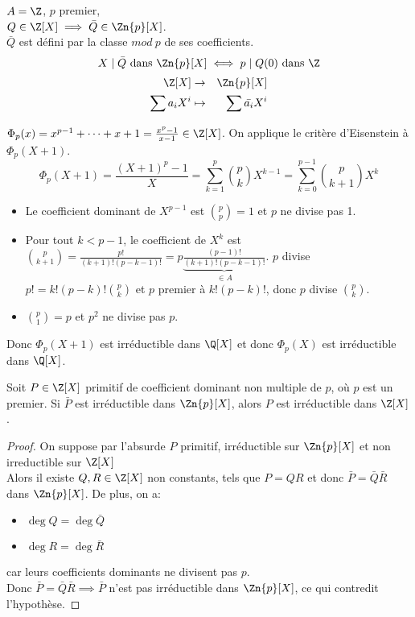\begin{example}
	$A = \Z$, $p$ premier,\\
	$Q \in \Z[X] \implies \bar{Q} \in \Zn{p}[X]$.\\
	$\bar{Q}$ est défini par la classe $mod\  p$ de ses coefficients.
	$$X \mid \bar{Q} \text{ dans } \Zn{p}[X] \iff p \mid Q(0) \text{ dans } \Z$$
	\begin{eqnarray*}
		\Z[X] &\to& \Zn{p}[X] \\
		\sum a_iX^i &\mapsto& \sum \bar{a_i}X^i
	\end{eqnarray*}
\end{example}


\begin{example}
	$\Phi_p(x) = x^{p-1} + \cdots + x + 1  = \frac{x^p - 1}{x-1} \in \Z[X]$.
	On applique le critère d'Eisenstein à $\Phi_p(X+1)$.
	$$ \Phi_p(X+1) = \frac{(X+1)^p - 1}{X} = \sum_{k=1}^p \binom{p}{k} X^{k-1} = \sum_{k=0}^{p-1} \binom{p}{k+1} X^k$$
	\begin{itemize}
		\item Le coefficient dominant de $X^{p-1}$ est $\binom{p}{p} = 1$ et $p$ ne divise pas 1.
		\item Pour tout $k < p-1$, le coefficient de $X^k$ est $\binom{p}{k+1} = \frac{p!}{(k+1)!(p-k-1)!} = p \underbrace{\frac{(p-1)!}{(k+1)!(p-k-1)!}}_{\in A}$.
		      $p$ divise $p! = k!(p-k)!\binom{p}{k}$ et $p$ premier à $k!(p-k)!$, donc $p$ divise $\binom{p}{k}$.
		\item $\binom{p}{1} = p$ et $p^2$ ne divise pas $p$.
	\end{itemize}
	Donc $\Phi_p(X+1)$ est irréductible dans $\Q[X]$ et donc $\Phi_p(X)$ est irréductible dans $\Q[X]$.
\end{example}


\begin{prop}
	Soit $P \in \Z[X]$ primitif de coefficient dominant non multiple de $p$, où $p$ est un premier.
	Si $\bar{P}$ est irréductible dans  $\Zn{p}[X]$, alors $P$ est irréductible dans $\Z[X]$.
\end{prop}

\begin{proof}
	On suppose par l'absurde $P$ primitif, irréductible sur $\Zn{p}[X]$ et non irreductible sur $\Z[X]$\\
	Alors il existe $Q, R \in \Z[X]$ non constants, tels que $P = QR$
	et donc $\bar{P} = \bar{Q}\bar{R}$ dans $\Zn{p}[X]$.
	De plus, on a:
	\begin{itemize}
		\item $\deg Q = \deg \bar{Q}$
		\item $\deg R = \deg \bar{R}$

	\end{itemize}
	car leurs coefficients dominants ne divisent pas $p$.\\
	Donc $\bar{P} = \bar{Q}\bar{R} \implies \bar{P}$ n'est pas irréductible dans $\Zn{p}[X]$, ce qui contredit l'hypothèse.
\end{proof}
